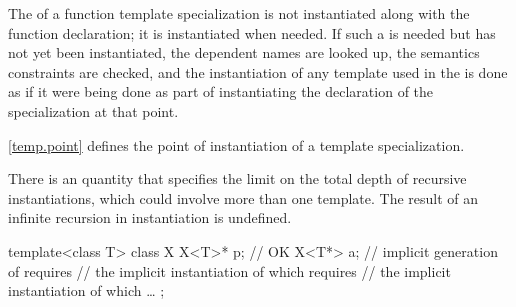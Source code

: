 \pnum
The  of a function template specialization
is not instantiated along with the function declaration; it is instantiated
when needed. If such a
 is needed but has not yet been
instantiated, the dependent names are looked up, the semantics constraints are
checked, and the instantiation of any template used in the
 is done as if it were being done as part
of instantiating the declaration of the specialization at that point.

\pnum
\begin{note}
\ref{temp.point} defines the point of instantiation of a template specialization.
\end{note}

\pnum
There is an  quantity
that specifies the limit on the total depth of recursive instantiations,
which could involve more than one template.
The result of an infinite recursion in instantiation is undefined.
\begin{example}
\begin{codeblock}
template<class T> class X {
  X<T>* p;          // OK
  X<T*> a;          // implicit generation of  requires
                    // the implicit instantiation of  which requires
                    // the implicit instantiation of  which \ldots
};
\end{codeblock}
\end{example}

